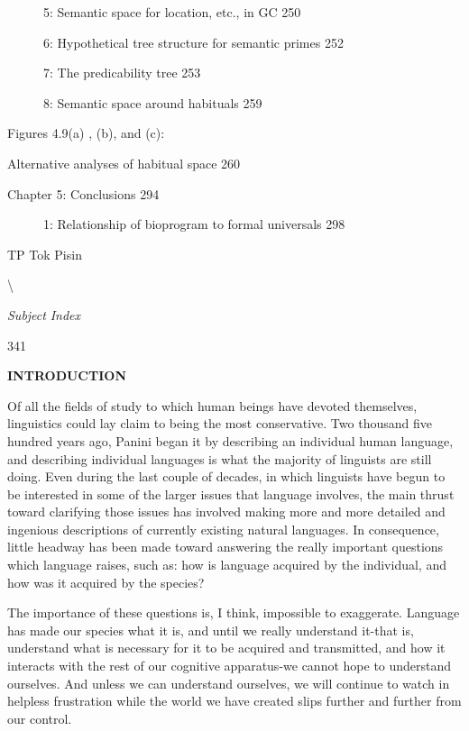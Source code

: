 \begin{figure}
\caption{5: Semantic space for location, etc., in GC 250}
\label{fig:4}
\end{figure}

\begin{figure}
\caption{6: Hypothetical tree structure for semantic primes 252}
\label{fig:4}
\end{figure}

\begin{figure}
\caption{7: The predicability tree 253}
\label{fig:4}
\end{figure}

\begin{figure}
\caption{8: Semantic space around habituals 259}
\label{fig:4}
\end{figure}

Figures 4.9(a) , (b), and (c):

Alternative analyses of habitual space 260

Chapter 5: Conclusions 294

\begin{figure}
\caption{1: Relationship of bioprogram to formal universals 298}
\label{fig:5}
\end{figure}

TP Tok Pisin 

{\textbackslash}

\textit{Subject} \textit{Index}

341

\bfseries
\hypertarget{TOC250000}{}INTRODUCTION

Of all the fields of study to which human beings have devoted themselves, linguistics could lay claim to being the most conservative. Two thousand five hundred years ago, Panini began it by describing an individual human language, and describing individual languages is what the majority of linguists are still doing. Even during the last couple of decades, in which linguists have begun to be interested in some of the larger issues that language involves, the main thrust toward clarifying those issues has involved making more and more detailed and ingenious descriptions of currently existing natural languages. In consequence, little headway has been made toward answering the really important questions which language raises, such as: how is language acquired by the individual, and how was it acquired by the species?

The importance of these questions is, I think, impossible to exaggerate. Language has made our species what it is, and until we really understand it-that is, understand what is necessary for it to be acquired and transmitted, and how it interacts with the rest of our cognitive apparatus-we cannot hope to understand ourselves. And unless we can understand ourselves, we will continue to watch in helpless frustration while the world we have created slips further and further from our control.

